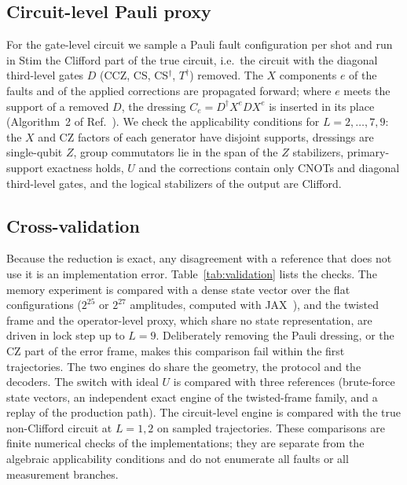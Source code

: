 \documentclass[a4paper]{article}
\begin{document}
\subsection{Circuit-level Pauli proxy}
\label{sec:circ}

For the gate-level circuit we sample a Pauli fault configuration per shot and run in Stim the Clifford part of the true circuit, i.e.\ the circuit with the diagonal third-level gates $D$ (CCZ, CS, CS$^\dagger$, $T^\dagger$) removed. The $X$ components $e$ of the faults and of the applied corrections are propagated forward; where $e$ meets the support of a removed $D$, the dressing $C_e=D^\dagger X^eDX^e$ is inserted in its place (Algorithm~2 of Ref.~\cite{takada2026exact}). We check the applicability conditions for $L=2,\dots,7,9$: the $X$ and CZ factors of each generator have disjoint supports, dressings are single-qubit $Z$, group commutators lie in the span of the $Z$ stabilizers, primary-support exactness holds, $U$ and the corrections contain only CNOTs and diagonal third-level gates, and the logical stabilizers of the output are Clifford.

\subsection{Cross-validation}

Because the reduction is exact, any disagreement with a reference that does not use it is an implementation error. Table~\ref{tab:validation} lists the checks. The memory experiment is compared with a dense state vector over the flat configurations ($2^{25}$ or $2^{27}$ amplitudes, computed with JAX~\cite{jax2018github}), and the twisted frame and the operator-level proxy, which share no state representation, are driven in lock step up to $L=9$. Deliberately removing the Pauli dressing, or the CZ part of the error frame, makes this comparison fail within the first trajectories. The two engines do share the geometry, the protocol and the decoders. The switch with ideal $U$ is compared with three references (brute-force state vectors, an independent exact engine of the twisted-frame family, and a replay of the production path). The circuit-level engine is compared with the true non-Clifford circuit at $L=1,2$ on sampled trajectories. These comparisons are finite numerical checks of the implementations; they are separate from the algebraic applicability conditions and do not enumerate all faults or all measurement branches.
\end{document}
